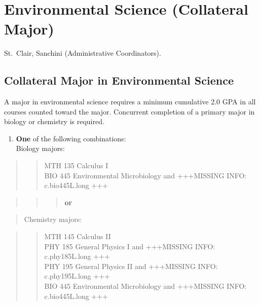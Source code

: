 \documentclass[
  letterpaper,
]{scrbook}
\providecommand{\tightlist}{%
  \setlength{\itemsep}{0pt}\setlength{\parskip}{0pt}}
\begin{document}
\section{Environmental Science (Collateral
Major)}\label{sec-environmental-science}

St.~Clair, Sanchini (Administrative Coordinators).

\subsection{Collateral Major in Environmental
Science}\label{collateral-major-in-environmental-science}

A major in environmental science requires a minimum cumulative 2.0 GPA
in all courses counted toward the major. Concurrent completion of a
primary major in biology or chemistry is required.

\begin{enumerate}
\def\labelenumi{\arabic{enumi}.}
\tightlist
\item
  \textbf{One} of the following combinations:\\
  Biology majors:
\end{enumerate}

\begin{quote}
\begin{quote}
MTH 135 Calculus I\\
BIO 445 Environmental Microbiology and +++MISSING INFO: c.bio445L.long
+++
\end{quote}
\end{quote}

\begin{quote}
\begin{quote}
\begin{quote}
\textbf{or}
\end{quote}
\end{quote}
\end{quote}

\begin{quote}
Chemistry majors:
\end{quote}

\begin{quote}
\begin{quote}
MTH 145 Calculus II\\
PHY 185 General Physics I and +++MISSING INFO: c.phy185L.long +++\\
PHY 195 General Physics II and +++MISSING INFO: c.phy195L.long +++\\
BIO 445 Environmental Microbiology and +++MISSING INFO: c.bio445L.long
+++
\end{quote}
\end{quote}
\end{document}
